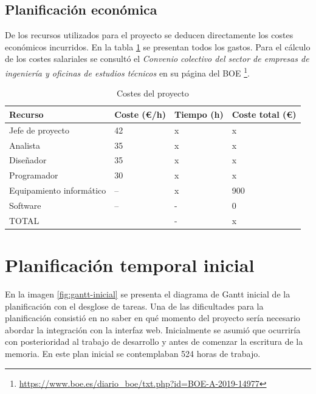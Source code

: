\subsection{Planificación económica}

De los recursos utilizados para el proyecto se deducen directamente los costes económicos incurridos. En la tabla \ref{tab:costes-proyecto} se presentan todos los gastos. Para el cálculo de los costes salariales se consultó el \emph{Convenio colectivo del sector de empresas de ingeniería y oficinas de estudios técnicos} en su página del BOE \footnote{\url{https://www.boe.es/diario_boe/txt.php?id=BOE-A-2019-14977}}.

\begin{table}[ht]
    \centering
    \begin{tabular}{l l l l}
        Recurso & Coste (€/h) & Tiempo (h) & Coste total (€) \\
        \hline
        \hline
        Jefe de proyecto & 42 & x & x \\
        Analista & 35 & x & x \\
        Diseñador & 35 & x & x \\
        Programador & 30 & x & x \\
        Equipamiento informático & -- & x & 900 \\
        Software & -- & - & 0 \\        
        \hline
        \hline
        TOTAL & & - & x \\        
    \end{tabular}
    \label{tab:costes-proyecto}
    \caption{Costes del proyecto}
\end{table}

\section{Planificación temporal inicial}

En la imagen \ref{fig:gantt-inicial} se presenta el diagrama de Gantt inicial de la planificación con el desglose de tareas. Una de las dificultades para la planificación consistió en no saber en qué momento del proyecto sería necesario abordar la integración con la interfaz web. Inicialmente se asumió que ocurriría con posterioridad al trabajo de desarrollo y antes de comenzar la escritura de la memoria. En este plan inicial se contemplaban 524 horas de trabajo.

